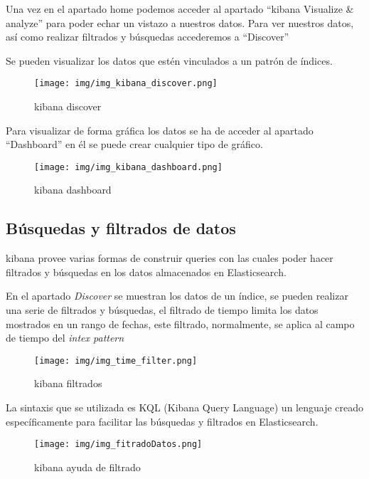 Una vez en el apartado home podemos acceder al apartado ``kibana Visualize \& analyze'' para poder echar un vistazo a nuestros datos. Para ver nuestros datos, así como realizar filtrados y búsquedas accederemos a ``Discover''

Se pueden visualizar los datos que estén vinculados a un patrón de índices.

\begin{figure}[h]
	\centering
	\texttt{[image: img/img\_kibana\_discover.png]}
	\caption{kibana discover}
	\label{img_kibana_discover}
\end{figure}

Para visualizar de forma gráfica los datos se ha de acceder al apartado ``Dashboard'' en él se puede crear cualquier tipo de gráfico.

\begin{figure}[h]
	\centering
	\texttt{[image: img/img\_kibana\_dashboard.png]}
	\caption{kibana dashboard}
	\label{img_kibana_dashboard}
\end{figure}


\subsection{Búsquedas y filtrados de datos}

kibana provee varias formas de construir queries con las cuales poder hacer filtrados y búsquedas en los datos almacenados en Elasticsearch.

En el apartado \textit{Discover} se muestran los datos de un índice, se pueden realizar una serie de filtrados y búsquedas, el filtrado de tiempo limita los datos mostrados en un rango de fechas, este filtrado, normalmente, se aplica al campo de tiempo del \textit{intex pattern}

\begin{figure}[h]
	\centering
	\texttt{[image: img/img\_time\_filter.png]}
	\caption{kibana filtrados}
	\label{img_time_filter.png}
\end{figure}

La sintaxis que se utilizada es KQL (Kibana Query Language) un lenguaje creado específicamente para facilitar las búsquedas y filtrados en Elasticsearch. \cite{pagina:KQL}

\begin{figure}[h]
	\centering
	\texttt{[image: img/img\_fitradoDatos.png]}
	\caption{kibana ayuda de filtrado}
	\label{img_fitradoDatos.png}
\end{figure}
